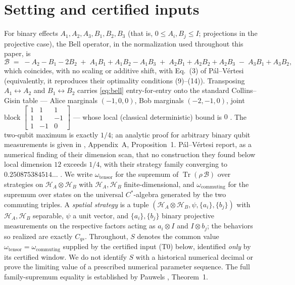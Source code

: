 \documentclass[11pt]{article}
\theoremstyle{remark}
\newcommand{\Cqs}{C_{qs}}
\newcommand{\B}{\mathcal{B}}
\begin{document}
\section{Setting and certified inputs}\label{sec:setup}

For binary effects $A_1,A_2,A_3,B_1,B_2,B_3$ (that is, $0\le A_i,B_j\le I$;
projections in the projective case), the Bell operator, in the
normalization used throughout this paper, is
\begin{equation}\label{eq:bell}
\B \;=\; -A_2-B_1-2B_2
\;+\;A_1B_1+A_1B_2-A_1B_3
\;+\;A_2B_1+A_2B_2+A_2B_3
\;-\;A_3B_1+A_3B_2 ,
\end{equation}
which coincides, with no scaling or additive shift, with Eq.~(3) of
P\'al--V\'ertesi \cite{PalVertesi} (equivalently, it reproduces their
optimality conditions (9)--(14)). Transposing $A_1\leftrightarrow A_2$ and
$B_1\leftrightarrow B_2$ carries \eqref{eq:bell} entry-for-entry onto the
standard Collins--Gisin table --- Alice marginals $(-1,0,0)$, Bob marginals
$(-2,-1,0)$, joint block $\left[\begin{smallmatrix}1&1&1\\1&1&-1\\1&-1&0
\end{smallmatrix}\right]$ --- whose local (classical deterministic) bound is
$0$ \cite{CollinsGisin}. The two-qubit maximum is exactly $1/4$;
an analytic proof for arbitrary binary qubit measurements is given in
\cite{Pauwels}, Appendix~A, Proposition~1. P\'al--V\'ertesi report, as a numerical finding of
their dimension scan, that no construction they found below local dimension
$12$ exceeds $1/4$, with their strategy family converging to
$0.250875384514\ldots$ \cite{PalVertesi}. We write
$\omega_{\mathrm{tensor}}$ for the supremum of $\operatorname{Tr}(\rho\,\B)$
over strategies on $\mathcal H_A\otimes\mathcal H_B$ with
$\mathcal H_A,\mathcal H_B$ finite-dimensional, and
$\omega_{\mathrm{commuting}}$ for the supremum over states on the universal
$C^*$-algebra generated by the two commuting triples. A \emph{spatial
strategy} is a tuple $(\mathcal H_A\otimes\mathcal H_B,\psi,\{a_i\},\{b_j\})$
with $\mathcal H_A,\mathcal H_B$ separable, $\psi$ a unit vector, and
$\{a_i\},\{b_j\}$ binary projective measurements on the respective factors
acting as $a_i\otimes I$ and $I\otimes b_j$; the behaviors so realized are
exactly $\Cqs$. Throughout, $S$ denotes the common value
$\omega_{\mathrm{tensor}}=\omega_{\mathrm{commuting}}$ supplied by the
certified input (T0) below, identified \emph{only} by its certified
window. We do not identify $S$ with a historical numerical decimal
or prove the limiting value of a prescribed numerical parameter sequence.
The full family-supremum equality is established by Pauwels
\cite{Pauwels}, Theorem~1.
\end{document}
